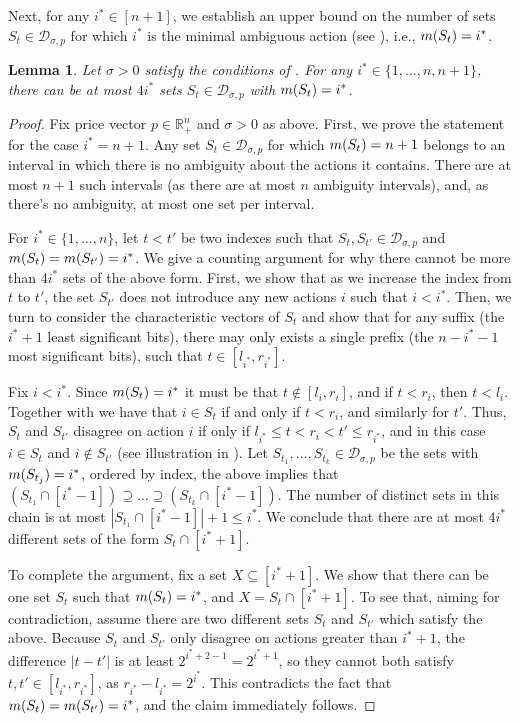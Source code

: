 \documentclass[11pt]{article}
\newtheorem{lemma}{Lemma}
\newcommand{\reals}{\mathbb{R}}
\newcommand{\demand}[2]{\mathcal{D}_{{#1},{#2}}}
\newcommand{\demSigP}{\demand{\sigma}{p}}
\begin{document}
Next, for any $i^* \in [n+1]$,  we establish an upper bound on the number of sets $S_t \in \demSigP$ for which $i^*$ is the minimal ambiguous action (see ), i.e., $m(S_t) = i^*$.

\begin{lemma}\label{lem:minAmb}
Let $\sigma > 0$ satisfy the conditions of . For any $i^* \in \{1,...,n,n+1\}$, there can be at most $4i^*$ sets $S_t \in \demSigP$ with $m(S_t)=i^*$.
\end{lemma}

\begin{proof}
    Fix price vector $p \in \reals^n_+$ and $\sigma >0$ as above.
    First, we prove the statement for the case $i^*=n+1$.
    Any set $S_t \in \demSigP$ for which $m(S_t)=n+1$ belongs to an interval in which there is no ambiguity about the actions it contains. There are at most $n+1$ such intervals (as there are at most $n$ ambiguity intervals), and, as there's no ambiguity, at most one set per interval.

    For $i^* \in \{1,\dots,n\}$, let $t < t'$ be two indexes such that $S_t, S_{t'} \in \demSigP$ and $m(S_t) = m(S_{t'}) = i^*$.
    We give a counting argument for why there cannot be more than $4i^*$ sets of the above form. 
    First, we show that as we increase the index from $t$ to $t'$, the set $S_{t'}$ does not introduce any new actions $i$ such that $i<i^*$. 
    Then, we turn to consider the characteristic vectors of $S_t$ and show that for any suffix (the $i^* + 1$ least significant bits), there may only exists a single prefix (the $n-i^*-1$ most significant bits), such that $t \in [l_{i^*}, r_{i^*}]$.    

    Fix $i < i^*$. Since $m(S_t)=i^*$ it must be that $t \notin [l_i,r_i]$, and if $t < r_i$, then $t < l_i$. 
    Together with  we have that $i \in S_t$ if and only if $t < r_i$, and similarly for $t'$.
    Thus, $S_t$ and $S_{t'}$ disagree on action $i$ if only if $l_{i^*} \le t < r_i < t' \le r_{i^*}$, and in this case $i \in S_t$ and $i \notin S_{t'}$ (see illustration in ). 
    Let $S_{t_1},\dots,S_{t_k} \in \demSigP$ be the sets with $m(S_{t_j})=i^*$, ordered by index, the above implies that 
    $(S_{t_1} \cap [i^*-1]) \supseteq \dots \supseteq (S_{t_{k}} \cap [i^*-1])$. 
    The number of distinct sets in this chain is at most $|S_{t_1} \cap [i^*-1]| + 1\le i^*$. We conclude that there are at most $4i^*$ different sets of the form $S_t \cap [i^*+1]$.
    
    To complete the argument, fix a set $X \subseteq [i^*+1]$. We show that there can be one set $S_t$ such that $m(S_t)=i^*$, and $X =S_t \cap [i^*+1]$. To see that, aiming for contradiction, assume there are two different sets $S_t$ and $S_{t'}$ which satisfy the above. Because $S_t$ and $S_{t'}$ only disagree on actions greater than $i^*+1$, the difference $|t-t'|$ is at least $2^{i^*+2-1} = 2^{i^*+1}$, so they cannot both satisfy $t,t' \in [l_{i^*},r_{i^*}]$, as $r_{i^*} - l_{i^*} = 2^{i^*}$. This contradicts the fact that $m(S_t)=m(S_{t'})=i^*$, and the claim immediately follows.
\end{proof}
\end{document}
